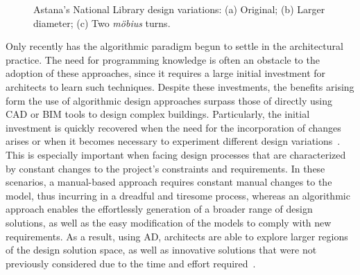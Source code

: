 \begin{figure}[htbp]
\centering
{}%
\hfill
{}%
\hfill
{}%

\caption[Design variations of the Astana's National Library]{Astana's National Library design variations: (a) Original; (b) Larger diameter; (c) Two \textit{möbius} turns.}
\label{fig:astana}
\end{figure}

Only recently has the algorithmic paradigm begun to settle in the architectural practice. The need for programming knowledge is often an obstacle to the adoption of these approaches, since it requires a large initial investment for architects to learn such techniques. Despite these investments, the benefits arising form the use of algorithmic design approaches surpass those of directly using \ac{CAD} or \ac{BIM} tools  to design complex buildings. Particularly, the initial investment is quickly recovered when the need for the incorporation of changes arises or when it becomes necessary to experiment different design variations~\cite{Leitao2014GD}. This is especially important when facing design processes that are characterized by constant changes to the project's constraints and requirements. In these scenarios, a manual-based approach requires constant manual changes to the model, thus incurring in a dreadful and tiresome process, whereas an algorithmic approach enables the effortlessly generation of a broader range of design solutions, as well as the easy modification of the models to comply with new requirements. As a result, using \ac{AD}, architects are able to explore larger regions of the design solution space, as well as innovative solutions that were not previously considered due to the time and effort required~\cite{Leitao2014GD}.


